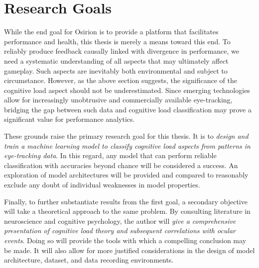 \section{Research Goals} \label{sec:intro/research_goals}

While the end goal for Osirion is to provide a platform that facilitates performance and health, this thesis is merely a means toward this end. To reliably produce feedback causally linked with divergence in performance, we need a systematic understanding of all aspects that may ultimately affect gameplay. Such aspects are inevitably both environmental and subject to circumstance. However, as the above section suggests, the significance of the cognitive load aspect should not be underestimated. Since emerging technologies allow for increasingly unobtrusive and commercially available eye-tracking, bridging the gap between such data and cognitive load classification may prove a significant value for performance analytics.

These grounds raise the primary research goal for this thesis. It is to \textit{design and train a machine learning model to classify cognitive load aspects from patterns in eye-tracking data}. In this regard, any model that can perform reliable classification with accuracies beyond chance will be considered a success. An exploration of model architectures will be provided and compared to reasonably exclude any doubt of individual weaknesses in model properties.

Finally, to further substantiate results from the first goal, a secondary objective will take a theoretical approach to the same problem. By consulting literature in neuroscience and cognitive psychology, the author will \textit{give a comprehensive presentation of cognitive load theory and subsequent correlations with ocular events}. Doing so will provide the tools with which a compelling conclusion may be made. It will also allow for more justified considerations in the design of model architecture, dataset, and data recording environments.



